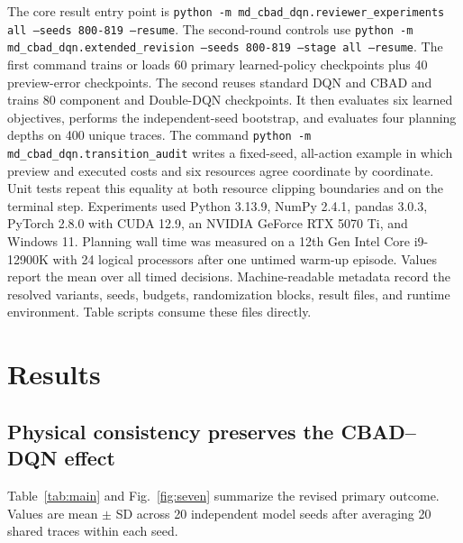 \documentclass[11pt]{article}
\begin{document}
{\color{red}%
The core result entry point is \texttt{python -m md\_cbad\_dqn.reviewer\_experiments all --seeds 800-819 --resume}. The second-round controls use \texttt{python -m md\_cbad\_dqn.extended\_revision --seeds 800-819 --stage all --resume}. The first command trains or loads 60 primary learned-policy checkpoints plus 40 preview-error checkpoints. The second reuses standard DQN and CBAD and trains 80 component and Double-DQN checkpoints. It then evaluates six learned objectives, performs the independent-seed bootstrap, and evaluates four planning depths on 400 unique traces. The command \texttt{python -m md\_cbad\_dqn.transition\_audit} writes a fixed-seed, all-action example in which preview and executed costs and six resources agree coordinate by coordinate. Unit tests repeat this equality at both resource clipping boundaries and on the terminal step. Experiments used Python 3.13.9, NumPy 2.4.1, pandas 3.0.3, PyTorch 2.8.0 with CUDA 12.9, an NVIDIA GeForce RTX 5070 Ti, and Windows 11. Planning wall time was measured on a 12th Gen Intel Core i9-12900K with 24 logical processors after one untimed warm-up episode. Values report the mean over all timed decisions. Machine-readable metadata record the resolved variants, seeds, budgets, randomization blocks, result files, and runtime environment. Table scripts consume these files directly.
}%

\section{Results}
\label{sec:results}

\subsection{Physical consistency preserves the CBAD--DQN effect}

Table~\ref{tab:main} and Fig.~\ref{fig:seven} summarize the revised primary outcome. Values are mean $\pm$ SD across 20 independent model seeds after averaging 20 shared traces within each seed.

\begin{table}[H]
\centering
{\color{red}%
\caption{Episode total cost for deployment comparators under the physically coupled generator. All learned policies were trained only at nominal $c=1$; static and reduced-coupling rows are transfers without retraining. MPC-4 is exact only for its stated four-step perfect-forecast objective. Lower is better; bold marks the lowest mean.}
\label{tab:main}
}%
\resizebox{\textwidth}{!}{}
\end{table}
\end{document}
